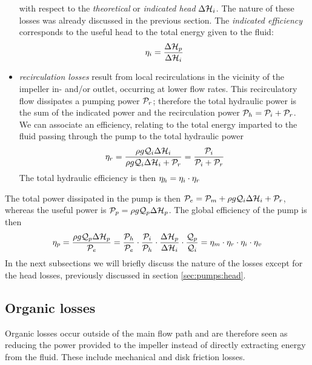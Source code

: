 \begin{itemize}
  with respect to the \emph{theoretical} or \emph{indicated head}
  $\Delta \mathcal H_i$. The nature of these losses was already discussed in the
  previous section. The \emph{indicated efficiency} corresponds to the
  useful head to the total energy given to the fluid:
  \begin{align*}
    \eta_i = \frac{\Delta \mathcal H_p}{\Delta \mathcal H_i}
  \end{align*}
\item \emph{recirculation losses} result from local recirculations in
  the vicinity of the impeller in- and/or outlet, occurring at lower
  flow rates. This recirculatory flow dissipates a pumping power
  $\mathcal P_r$; therefore the total hydraulic power is the sum of the
  indicated power and the recirculation power $\mathcal P_h = \mathcal P_i +
  \mathcal P_r$. We can associate an efficiency, relating to the total
  energy imparted to the fluid passing through the pump to the total
  hydraulic power
  \begin{align*}
    \eta_r = 
    \frac{\rho g \mathcal Q_i \Delta \mathcal H_i}{\rho g \mathcal Q_i \Delta \mathcal H_i + \mathcal P_r} = 
    \frac{\mathcal P_i}{\mathcal P_i + \mathcal P_r}
  \end{align*}
  The total hydraulic efficiency is then $\eta_h = \eta_i \cdot \eta_r$
\end{itemize}
The total power dissipated in the pump is then $\mathcal P_e = \mathcal P_m +
\rho g \mathcal Q_i \Delta \mathcal H_i + \mathcal P_r$, whereas the useful power is
$\mathcal P_p = \rho g \mathcal Q_p \Delta \mathcal H_p$. The global efficiency of
the pump is then
\begin{align*}
  \eta_p = 
  \frac{\rho g \mathcal Q_p \Delta \mathcal H_p}{\mathcal P_e} = 
  \frac{\mathcal P_h}{\mathcal P_e} \cdot 
  \frac{\mathcal P_i}{\mathcal P_h} \cdot 
  \frac{\Delta \mathcal H_p}{\Delta \mathcal H_i} \cdot 
  \frac{\mathcal Q_p}{\mathcal Q_i} 
  = \eta_m \cdot \eta_r \cdot \eta_i \cdot \eta_v
\end{align*}
In the next subsections we will briefly discuss the nature of the
losses except for the head losses, previously discussed in section
\ref{sec:pumps:head}.

\subsection{Organic losses}

Organic losses occur outside of the main flow path and are therefore
seen as reducing the power provided to the impeller instead of
directly extracting energy from the fluid. These include mechanical
and disk friction losses.

